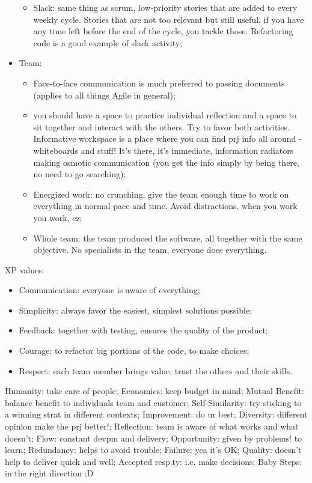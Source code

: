 \begin{itemize}
\begin{itemize}
        \item Slack: same thing as scrum, low-priority stories that are added to every weekly cycle. Stories that are not too relevant but still useful, if you have any time left before the end of the cycle, you tackle those. Refactoring code is a good example of slack activity;
    \end{itemize}
    \item Team:
    \begin{itemize}
        \item Face-to-face communication is much preferred to passing documents (applies to all things Agile in general);
        \item you should have a space to practice individual reflection and a space to sit together and interact with the others. Try to favor both activities. Informative workspace is a place where you can find prj info all around - whiteboards and stuff! It's there, it's immediate, information radiators making osmotic communication (you get the info simply by being there, no need to go searching);
        \item Energized work: no crunching, give the team enough time to work on everything in normal pace and time. Avoid distractions, when you work you work, ez;
        \item Whole team: the team produced the software, all together with the same objective. No specialists in the team, everyone does everything.
    \end{itemize}
\end{itemize}

\noindent XP values:
\begin{itemize}
    \item Communication: everyone is aware of everything;
    \item Simplicity: always favor the easiest, simplest solutions possible;
    \item Feedback: together with testing, ensures the quality of the product;
    \item Courage: to refactor big portions of the code, to make choices;
    \item Respect: each team member brings value, trust the others and their skills.
\end{itemize}

\noindent Humanity: take care of people; Economics: keep budget in mind; Mutual Benefit: balance benefit to individuals team and customer; Self-Similarity: try sticking to a winning strat in different contexts; Improvement: do ur best; Diversity: different opinion make the prj better!; Reflection: team is aware of what works and what doesn't; Flow: constant devpm and delivery; Opportunity: given by problems! to learn; Redundancy: helps to avoid trouble; Failure: yea it's OK; Quality: doesn't help to deliver quick and well; Accepted resp.ty: i.e. make decisions; Baby Steps: in the right direction :D

